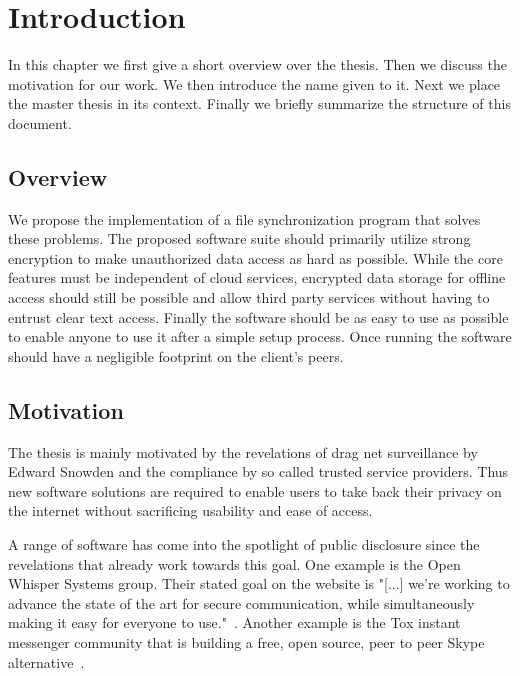 \chapter{Introduction}
\label{chap:intro}

In this chapter we first give a short overview over the thesis.
Then we discuss the motivation for our work.
We then introduce the name given to it.
Next we place the master thesis in its context.
Finally we briefly summarize the structure of this document.

\section{Overview}

We propose the implementation of a file synchronization program that solves these problems.
The proposed software suite should primarily utilize strong encryption to make unauthorized data access as hard as possible.
While the core features must be independent of cloud services, encrypted data storage for offline access should still be possible and allow third party services without having to entrust clear text access.
Finally the software should be as easy to use as possible to enable anyone to use it after a simple setup process.
Once running the software should have a negligible footprint on the client's peers.

\section{Motivation}

The thesis is mainly motivated by the revelations of drag net surveillance by Edward Snowden and the compliance by so called trusted service providers.
Thus new software solutions are required to enable users to take back their privacy on the internet without sacrificing usability and ease of access.

A range of software has come into the spotlight of public disclosure since the revelations that already work towards this goal.
One example is the Open Whisper Systems group.
Their stated goal on the website is "[...] we're working to advance the state of the art for secure communication, while simultaneously making it easy for everyone to use."~\cite{web:site:whispersystems:about}.
Another example is the Tox instant messenger community that is building a free, open source, peer to peer Skype alternative~\cite{web:site:tox}.


